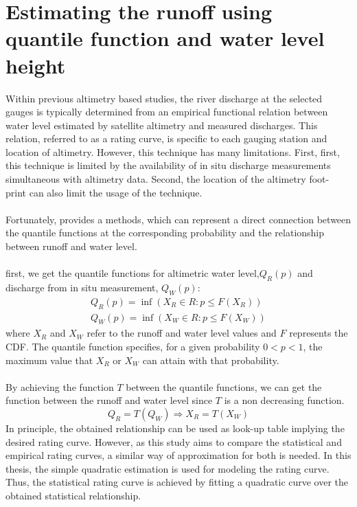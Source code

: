 \section{Estimating the runoff using quantile function and water level height}
Within previous altimetry based studies, the river discharge at the selected gauges is typically determined from an empirical functional relation between water level estimated by satellite altimetry and measured discharges. This relation, referred to as a rating curve, is specific to each gauging station and location of altimetry. However, this technique has many limitations. First, first, this technique is limited by the availability of in situ discharge measurements simultaneous with altimetry data. Second, the location of the altimetry foot- print can also limit the usage of the technique.\\\\
Fortunately, \cite{tourian2013quantile} provides a methods, which can represent a direct connection between the quantile functions at the corresponding probability and the relationship between runoff and water level. \\\\
first, we get the quantile functions for altimetric water level,$Q_R(p)$ and discharge from in situ measurement, $Q_W(p)$:
\begin{gather*}
	Q_R(p) = \inf(X_R \in R: p\leq F(X_R)) \\
	Q_W(p) = \inf(X_W \in R: p\leq F(X_W)) 
\end{gather*}
where $X_R$ and $X_W$ refer to the runoff and water level values and $F$ represents the CDF. The quantile function specifies, for a given probability $0 < p < 1$, the maximum value that $X_R$ or $X_W$ can attain with that probability.\\\\
By achieving the function $T$ between the quantile functions, we can get the function between the runoff and water level since $T$ is a non decreasing function. 
\begin{equation}
	Q_R = T(Q_W) \Longrightarrow X_R = T(X_W)
\end{equation}
In principle, the obtained relationship can be used as look-up table implying the desired rating curve. However, as this study aims to compare the statistical and empirical rating curves, a similar way of approximation for both is needed. In this thesis, the simple quadratic estimation is used for modeling the rating curve. Thus, the statistical rating curve
is achieved by fitting a quadratic curve over the obtained statistical relationship.